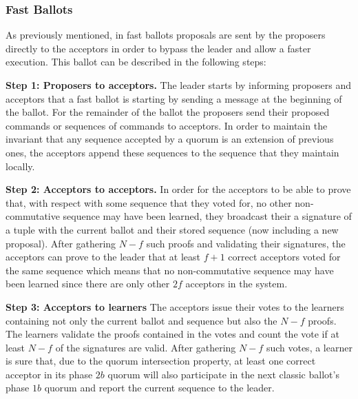 \subsubsection{Fast Ballots}
As previously mentioned, in fast ballots proposals are sent by the proposers directly to the acceptors in order to bypass the leader and allow a faster execution. This ballot can be described in the following steps:\par
\noindent\textbf{Step 1: Proposers to acceptors.} The leader starts by informing proposers and acceptors that a fast ballot is starting by sending a message at the beginning of the ballot. For the remainder of the ballot the proposers send their proposed commands or sequences of commands to acceptors. In order to maintain the invariant that any sequence accepted by a quorum is an extension of previous ones, the acceptors append these sequences to the sequence that they maintain locally.\par
\noindent\textbf{Step 2: Acceptors to acceptors.} In order for the acceptors to be able to prove that, with respect with some sequence that they voted for, no other non-commutative sequence may have been learned, they broadcast their a signature of a tuple with the current ballot and their stored sequence (now including a new proposal). After gathering $N-f$ such proofs and validating their signatures, the acceptors can prove to the leader that at least $f+1$ correct acceptors voted for the same sequence which means that no non-commutative sequence may have been learned since there are only other $2f$ acceptors in the system.\par
\noindent\textbf{Step 3: Acceptors to learners} The acceptors issue their votes to the learners containing not only the current ballot and sequence but also the $N-f$ proofs. The learners validate the proofs contained in the votes and count the vote if at least $N-f$ of the signatures are valid. After gathering $N-f$ such votes, a learner is sure that, due to the quorum intersection property, at least one correct acceptor in its phase $2b$ quorum will also participate in the next classic ballot's phase $1b$ quorum and report the current sequence to the leader.


